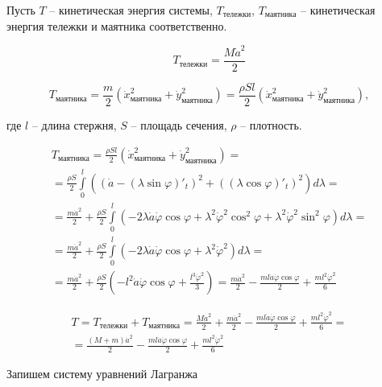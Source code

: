 Пусть $T$ -- кинетическая энергия системы, $T_{\text{тележки}}$, $T_{\text{маятника}}$ -- кинетическая энергия тележки и маятника соответственно.

\begin{equation}
    T_{\text{тележки}} = \frac{M \dot{a}^2}{2}
\end{equation}

\begin{equation}
T_{\text{маятника}} = \frac{m}{2} \left( \dot{x}^2_{\text{маятника}} + \dot{y}^2_{\text{маятника}}  \right)  = \frac{\rho Sl}{2} \left( \dot{x}^2_{\text{маятника}} + \dot{y}^2_{\text{маятника}}  \right),
\end{equation}

где $l$ -- длина стержня, $S$ -- площадь сечения, $\rho$ -- плотность.

\begin{multline}
T_{\text{маятника}}   = \frac{\rho Sl}{2} \left( \dot{x}^2_{\text{маятника}} + \dot{y}^2_{\text{маятника}}  \right) = \\=\frac{\rho S}{2} \int \limits_0^l \left( \left( \dot{a} - \left( \lambda\sin \varphi \right)'_t \right)^2 + \left( \left(\lambda \cos \varphi \right)'_t \right)^2 \right) d \lambda =\\=
\frac{m\dot{a}^2}{2} + \frac{\rho S}{2} \int \limits_0^l \left(  -2 \lambda \dot{a} \dot {\varphi} \cos{\varphi} + \lambda^2  \dot {\varphi}^2 \cos^2\varphi +  \lambda^2 \dot{\varphi}^2 \sin^2 \varphi \right) d \lambda =\\= \frac{m\dot{a}^2}{2} + \frac{\rho S}{2} \int \limits_0^l \left(  -2 \lambda \dot{a} \dot {\varphi} \cos{\varphi} + \lambda^2  \dot {\varphi}^2  \right) d \lambda =\\= \frac{m\dot{a}^2}{2} + \frac{\rho S}{2} (-l^2 \dot{a} \dot {\varphi} \cos{\varphi} + \frac{l^3\dot {\varphi}^2}{3})  = 
\frac{m\dot{a}^2}{2} - \frac{ml \dot{a} \dot{\varphi}\cos{\varphi}}{2} + \frac{ml^2\dot {\varphi} ^2}{6}
\end{multline}


\begin{multline}
    T = T_{\text{тележки}} + T_{\text{маятника}} = 
    \frac{M \dot{a}^2}{2} + \frac{m\dot{a}^2}{2} - \frac{ml \dot{a} \dot{\varphi}\cos{\varphi}}{2} + \frac{ml^2\dot {\varphi} ^2}{6} =\\=
    \frac{(M+m) \dot{a}^2}{2} - \frac{ml\dot{a}  \dot{\varphi} \cos \varphi}{2} + \frac{ml^2 \dot{\varphi}^2}{6}
\end{multline}

Запишем систему уравнений Лагранжа

